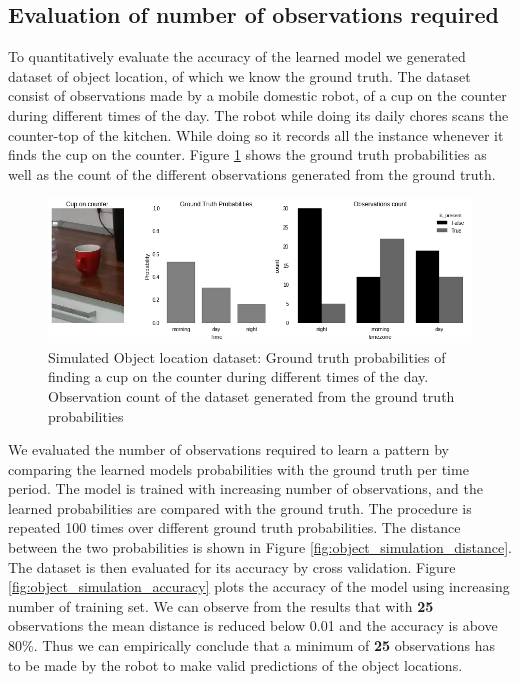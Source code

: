 \subsection*{Evaluation of number of observations required}

To quantitatively evaluate the accuracy of the learned model we generated dataset of object location, of which we know the ground truth. The dataset consist of observations made by a mobile domestic robot, of a cup on the counter during different times of the day. The robot while doing its daily chores scans the counter-top of the kitchen. While doing so it records all the instance whenever it finds the cup on the counter. Figure \ref{simulation} shows the ground truth probabilities as well as the count of the different observations generated from the ground truth.

\begin{figure}[htp]
\centering
\includegraphics[width=\textwidth]{images/object_simulation.png}
\caption[Simulated object location dataset]{Simulated Object location dataset: Ground truth probabilities of finding a cup on the counter during different times of the day. Observation count of the dataset generated from the ground truth probabilities}
\label{simulation}
\end{figure}

We evaluated the number of observations required to learn a pattern by comparing the learned models  probabilities with the ground truth per time period. The model is trained with increasing number of observations, and the learned probabilities are compared with the ground truth. The procedure is repeated 100 times over different ground truth probabilities. The distance between the two probabilities is shown in Figure \ref{fig:object_simulation_distance}. The dataset is then evaluated for its accuracy by cross validation. Figure \ref {fig:object_simulation_accuracy} plots the accuracy of the model using increasing number of training set. We can observe from the results that with \textbf{25} observations the mean distance is reduced below 0.01 and the accuracy is above 80\%. Thus we can empirically conclude that a minimum of \textbf{25} observations has to be made by the robot to make valid predictions of the object locations. 

